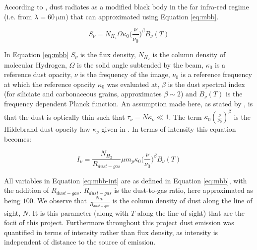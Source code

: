 \documentclass{report}
\begin{document}
According to \textcite{dustopacity}, dust radiates as a modified black body in the far infra-red regime (i.e. from $\lambda=\SI{60}{\micro\meter}$) that can approximated using Equation \ref{eq:mbb}.

\begin{equation} \label{eq:mbb}
  S_{\nu} = N_{H_{2}} \Omega \kappa_{0} \Big(\frac{\nu}{\nu_{0}}\Big)^{\beta} B_{\nu}(T)
\end{equation}

In Equation \ref{eq:mbb} $S_{\nu}$ is the flux density, $N_{H_{2}}$ is the column density of molecular Hydrogen, $\Omega$ is the solid angle subtended by the beam, $\kappa_{0}$ is a reference dust opacity, $\nu$ is the frequency of the image, $\nu_{0}$ is a reference frequency at which the reference opacity $\kappa_{0}$ was evaluated at, $\beta$ is the dust spectral index (for siliciate and carbonaceous grains, \textcite{beta} approximates $\beta \sim 2$) and $B_{\nu}(T)$ is the frequency dependent Planck function. An assumption made here, as stated by \textcite{kelly}, is that the dust is optically thin such that
$\tau_{\nu} = N\kappa_{\nu} \ll 1$. The term $\kappa_{0}(\frac{\nu}{\nu_{0}})^{\beta}$ is the Hildebrand dust opacity law $\kappa_{\nu}$ given in \textcite{dustopacity}. In terms of intensity this equation becomes:

\begin{equation} \label{eq:mbb-int}
  I_{\nu} = \frac{N_{H_{2}}}{R_{dust-gas}} \mu m_{p} \kappa_{0} \Big(\frac{\nu}{\nu_{0}}\Big)^{\beta} B_{\nu}(T)
\end{equation}

All variables in Equation \ref{eq:mbb-int} are as defined in Equation \ref{eq:mbb}, with the addition of $R_{dust-gas}$. $R_{dust-gas}$ is the dust-to-gas ratio, here approximated as being $100$. We observe that $\frac{N_{H_{2}}}{R_{dust-gas}}$ is the column density of dust along the line of sight, $N$. It is this parameter (along with $T$ along the line of sight) that are the focii of this project. Furthermore throughout this project dust emission was quantified in terms of intensity rather than flux density, as intensity is independent of distance to the source of emission.
\end{document}
